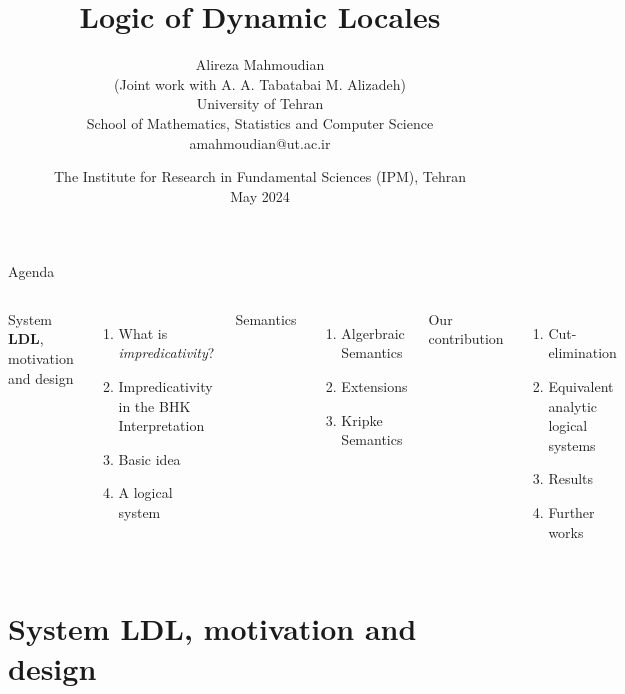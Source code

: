 \documentclass[handout]{beamer}
\title{Logic of Dynamic Locales}
\author{Alireza Mahmoudian\\ \small (Joint work with A. A. Tabatabai M. Alizadeh)\\ University of Tehran\\ School of Mathematics, Statistics and Computer Science\\ amahmoudian@ut.ac.ir}
\institute{}
\date{The Institute for Research in Fundamental Sciences (IPM), Tehran\\ May 2024}
\begin{document}
\begin{frame}
	\maketitle
\end{frame}

\def\secSTL{System $\mathbf{LDL}$, motivation and design}
\def\subImprDef{What is \emph{impredicativity}?}
\def\subBHK{Impredicativity in the BHK Interpretation}
\def\subIdea{Basic idea}
\def\subSTL{A logical system}
\def\secSemantics{Semantics}
\def\subAlgSemantics{Algerbraic Semantics}
\def\subExtensions{Extensions}
\def\subKripSemantics{Kripke Semantics}
\def\secProposal{Our contribution}
\def\subAnalytic{Cut-elimination}
\def\subGSTL{Equivalent analytic logical systems}
\def\subResults{Results}
\def\subFurther{Further works}

\begin{frame}{Agenda}
	\footnotesize
	\begin{enumerate}
		\begin{columns}
		\item \secSTL
		\begin{enumerate}
			\item \subImprDef
			\item \subBHK
			\item \subIdea
			\item \subSTL
		\end{enumerate}
		\item \secSemantics
		\begin{enumerate}
			\item \subAlgSemantics
			\item \subExtensions
			\item \subKripSemantics
		\end{enumerate}
		\item \secProposal
		\begin{enumerate}
			\item \subAnalytic
			\item \subGSTL
			\item \subResults
			\item \subFurther
		\end{enumerate}
	\end{columns}
	\end{enumerate}
\end{frame}

\section{\secSTL}
\end{document}
